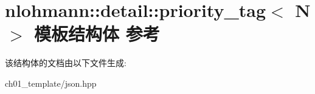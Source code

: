 \hypertarget{structnlohmann_1_1detail_1_1priority__tag}{}\section{nlohmann\+::detail\+::priority\+\_\+tag$<$ N $>$ 模板结构体 参考}
\label{structnlohmann_1_1detail_1_1priority__tag}


该结构体的文档由以下文件生成\+:\begin{DoxyCompactItemize}
\item 
ch01\+\_\+template/json.\+hpp\end{DoxyCompactItemize}
